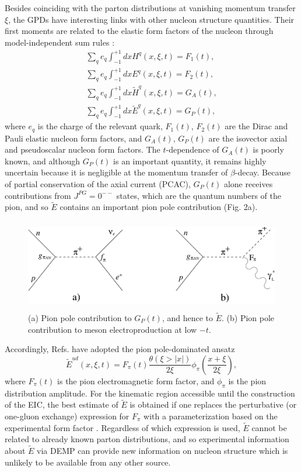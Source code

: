 Besides coinciding with the parton distributions at vanishing momentum transfer
$\xi$, the GPDs have interesting links with other nucleon structure quantities.
Their first moments are related to the elastic form factors of the nucleon
through model-independent sum rules \cite{Ra00}:
\begin{eqnarray}
\sum_q e_q \int^{+1}_{-1} dx H^q(x,\xi,t) = F_1(t),\\
\sum_q e_q \int^{+1}_{-1} dx E^q(x,\xi,t) = F_2(t),\\
\sum_q e_q \int^{+1}_{-1} dx \tilde{H}^q(x,\xi,t) = G_A(t),\\
\sum_q e_q \int^{+1}_{-1} dx \tilde{E}^q(x,\xi,t) = G_P(t),
\end{eqnarray}
where $e_q$ is the charge of the relevant quark, $F_1(t)$, $F_2(t)$ are the
Dirac and Pauli elastic nucleon form factors, and $G_A(t)$, $G_P(t)$ are the
isovector axial and pseudoscalar nucleon form factors.  The $t$-dependence of
$G_A(t)$ is poorly known, and although $G_P(t)$ is an important quantity, it
remains highly uncertain because it is negligible at the momentum transfer of
$\beta$-decay\cite{Th01}.  Because of partial conservation of the axial current
(PCAC), $G_P(t)$ alone
receives contributions from $J^{PG}=0^{--}$ states\cite{Ma69}, which are the
quantum numbers of the pion, and so $\tilde{E}$ contains an important pion pole
contribution (Fig. 2a).

\begin{figure}[hbtp!]
\begin{center}
\includegraphics[height=4cm]{figures/PCAC_pion_pole.pdf}
\end{center}
\caption{\label{fig:PCAC_pion_pole}
\footnotesize{(a) Pion pole contribution to $G_P(t)$, and hence to $\tilde{E}$.
(b) Pion pole contribution to meson electroproduction at low $-t$.}
}
\end{figure}

Accordingly, Refs. \cite{Pe00,Be01} have adopted the pion pole-dominated
ansatz
\begin{equation}
\tilde{E}^{ud}(x,\xi,t) = F_{\pi}(t)\frac{\theta (\xi>|x|)}{2\xi
}\phi_{\pi}(\frac{x+\xi}{2\xi}),
\label{eqn:Etilde}
\end{equation}
where $F_{\pi}(t)$ is the pion electromagnetic form factor, and $\phi_{\pi}$ is
the pion distribution amplitude.  For the kinematic region accessible until the
construction of the EIC, the best estimate of $\tilde{E}$ is obtained if one
replaces the perturbative (or one-gluon exchange) expression for $F_{\pi}$ with
a parameterization based on the experimental form factor \cite{Go10}.
Regardless of which expression is used, $\tilde{E}$ cannot be related to
already known parton distributions, and so experimental information about
$\tilde{E}$ via DEMP can provide new information on nucleon structure which is
unlikely to be available from any other source.

